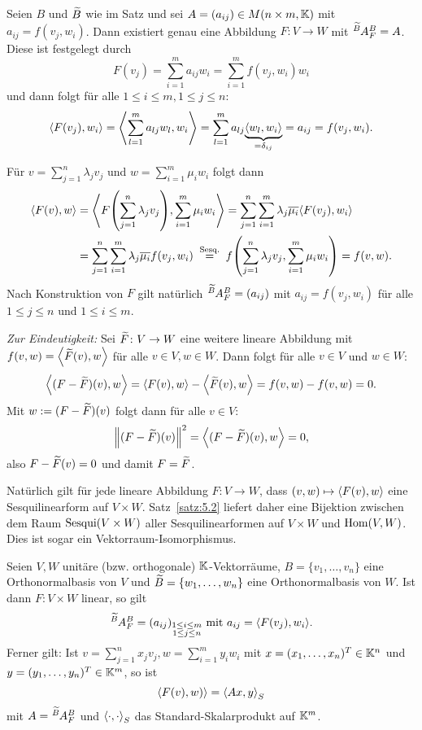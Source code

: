 \begin{beweis}
	Seien $B$ und $\widetilde{B}$ wie im Satz und sei $A = (a_{ij}) \in M(n \times m,\mathbb{K})$ mit $a_{ij} = f(v_j,w_i)$.
	Dann existiert genau eine Abbildung $F\colon V \rightarrow W$ mit $\mat{A}{\wt{B}}{B}{F} = A$.
	Diese ist festgelegt durch
	\[
		F(v_j) = \sum_{i=1}^{m} a_{ij} w_i = \sum_{i=1}^{m} f(v_j,w_i) w_i
	\]
	und dann folgt für alle $1 \leq i \leq m, 1 \leq j \leq n$:
	\[
		\left\langle F(v_j),w_i\right\rangle = \left\langle\sum_{l=1}^{m} a_{lj} w_l,w_i\right\rangle = \sum_{l=1}^{m} a_{lj} {\underbrace{\left\langle w_l,w_i\right\rangle}_{=\delta_{ij}}} = a_{ij} = f(v_j,w_i).
	\]
	 
	Für $v = \sum_{j=1}^{n} \lambda_j v_j$ und $w = \sum_{i=1}^{m} \mu_i w_i$ folgt dann
	\begin{align*}
		\sk{F(v),w} &= \sk{F \enb{\sum_{j=1}^{n} \lambda_j v_j}, \sum_{i=1}^{m} \mu_i w_i} = \sum_{j=1}^{n} \sum_{i=1}^{m} \lambda_j \ol{\mu_i} \sk{F(v_j),w_i} \\
		&= \sum_{j=1}^{n} \sum_{i=1}^{m} \lambda_j \ol{\mu_i} f(v_j,w_i) \stack{\text{Sesq.}}{=} f \enb{\sum_{j=1}^{n} \lambda_j v_j , \sum_{i=1}^{m} \mu_i w_i} = f(v,w).
	\end{align*}
	Nach Konstruktion von $F$ gilt natürlich $\mat{A}{\wt{B}}{B}{F} = (a_{ij})$ mit $a_{ij} = f(v_j,w_i)$ für alle $1 \leq j \leq n$ und $1 \leq i \leq m$.
	
	\textit{Zur Eindeutigkeit:} Sei $\widetilde{F} \colon V \rightarrow W$ eine weitere lineare Abbildung mit $f(v,w) = \left\langle\widetilde{F}(v),w\right\rangle$ für alle $v \in V, w \in W$.
	Dann folgt für alle $v \in V$ und $w \in W$:
	\[
		\left\langle(F-\widetilde{F})(v),w\right\rangle = \left\langle F(v),w\right\rangle - \left\langle\widetilde{F}(v),w\right\rangle = f(v,w) - f(v,w) = 0.
	\]
	Mit $w := (F-\widetilde{F})(v)$ folgt dann für alle $v \in V$:
	\[
		\left\lVert(F-\widetilde{F})(v)\right\rVert^2 = \left\langle(F - \widetilde{F})(v),w\right\rangle = 0,
	\]
	also $F - \widetilde{F}(v) = 0$ und damit $F = \widetilde{F}$. 
\end{beweis}

\begin{bemerkung}
	\label{bem:5.3}
	Natürlich gilt für jede lineare Abbildung $F \colon V \rightarrow W$, dass $(v,w) \mapsto \left\langle F(v),w\right\rangle$ eine Sesquilinearform auf $V \times W$.
	Satz~\ref{satz:5.2} liefert daher eine Bijektion zwischen dem Raum $\operatorname{Sesqui}(V \times W)$ aller Sesquilinearformen auf $V \times W$ und $\operatorname{Hom}(V,W)$. 
	Dies ist sogar ein Vektorraum-Isomorphismus.
\end{bemerkung}

\begin{korollar}
	\label{kor:5.4}
	Seien $V,W$ unitäre (bzw. orthogonale) $\mathbb{K}$-Vektorräume, $B = \{v_1,\dots,v_n\}$ eine Orthonormalbasis von $V$ und $\widetilde{B} = \{w_1,\dots,w_n\}$ eine Orthonormalbasis von $W$.
	Ist dann $F \colon V \times W$ linear, so gilt
	\[
		\mat{A}{\wt{B}}{B}{F} = (a_{ij})_{\substack{1 \leq i \leq m \\ 1 \leq j \leq n}} \text{ mit } a_{ij} = \sk{F(v_j),w_i}.
	\]
	Ferner gilt:
	Ist $v = \sum_{j=1}^{n} x_j v_j, w = \sum_{i=1}^{m} y_i w_i$ mit $x = (x_1,\dots,x_n)^T \in \mathbb{K}^n$ und $y = (y_1,\dots,y_n)^T \in \mathbb{K}^m$, so ist
	\[
		\left\langle F(v),w)\right\rangle = \left\langle Ax,y\right\rangle_S
	\]
	mit $A = \mat{A}{\wt{B}}{B}{F}$ und $\left\langle\cdot,\cdot\right\rangle_S$ das Standard-Skalarprodukt auf $\mathbb{K}^m$.
\end{korollar}
 
